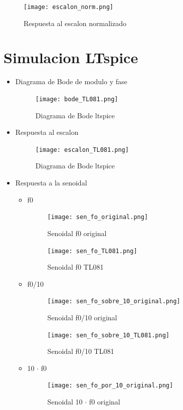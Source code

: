 \documentclass[11pt]{diazessay} %
\begin{document}
\begin{figure}[h]
\centering
	\texttt{[image: escalon\_norm.png]}
\caption{Respuesta al escalon normalizado}
\end{figure}

\newpage
\section*{Simulacion LTspice}
\begin{itemize}
\item Diagrama de Bode de modulo y fase
\begin{figure}[h]
\centering
	\texttt{[image: bode\_TL081.png]}
\caption{Diagrama de Bode ltspice}
\end{figure}

\newpage
\item Respuesta al escalon
\begin{figure}[h]
\centering
	\texttt{[image: escalon\_TL081.png]}
\caption{Diagrama de Bode ltspice}
\end{figure}

\newpage
\item Respuesta a la senoidal
\begin{itemize}
\item f0
\begin{figure}[h]
\centering
	\texttt{[image: sen\_fo\_original.png]}
\caption{Senoidal f0 original}
\end{figure}

\begin{figure}[h]
\centering
	\texttt{[image: sen\_fo\_TL081.png]}
\caption{Senoidal f0 TL081}
\end{figure}

\newpage
\item f0/10
\begin{figure}[h]
\centering
	\texttt{[image: sen\_fo\_sobre\_10\_original.png]}
\caption{Senoidal f0/10 original}
\end{figure}

\begin{figure}[h]
\centering
	\texttt{[image: sen\_fo\_sobre\_10\_TL081.png]}
\caption{Senoidal f0/10 TL081}
\end{figure}

\newpage
\item 10 $\cdot$ f0
\begin{figure}[h]
\centering
	\texttt{[image: sen\_fo\_por\_10\_original.png]}
\caption{Senoidal 10 $\cdot$ f0 original}
\end{figure}


\end{itemize}
\end{itemize}
\end{document}
